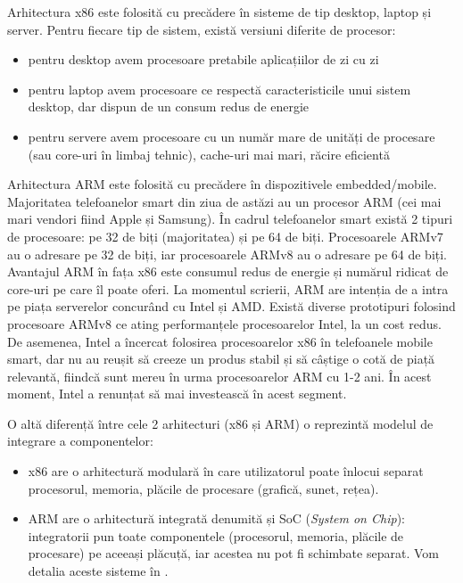 Arhitectura x86 este folosită cu precădere în sisteme de tip desktop, laptop și
server. Pentru fiecare tip de sistem, există versiuni diferite de procesor:

\begin{itemize}
  \item pentru desktop avem procesoare pretabile aplicațiilor de zi cu zi
  \item pentru laptop avem procesoare ce respectă caracteristicile unui
          sistem desktop, dar dispun de un consum redus de energie
  \item pentru servere avem procesoare cu un număr mare de unități de
          procesare (sau core-uri în limbaj tehnic), cache-uri mai mari,
          răcire eficientă
\end{itemize}

Arhitectura ARM este folosită cu precădere în dispozitivele embedded/mobile.
Majoritatea telefoanelor smart din ziua de astăzi au un procesor ARM (cei mai
mari vendori fiind Apple și Samsung). În cadrul telefoanelor smart există 2
tipuri de procesoare: pe 32 de biți (majoritatea) și pe 64 de biți. Procesoarele
ARMv7 au o adresare pe 32 de biți, iar procesoarele ARMv8 au o adresare pe 64 de
biți. Avantajul ARM în fața x86 este consumul redus de energie și numărul
ridicat de core-uri pe care îl poate oferi. La momentul scrierii, ARM are
intenția de a intra pe piața serverelor concurând cu Intel și AMD. Există
diverse prototipuri folosind procesoare ARMv8 ce ating performanțele
procesoarelor Intel, la un cost redus. De asemenea, Intel a încercat folosirea
procesoarelor x86 în telefoanele mobile smart, dar nu au reușit să creeze un
produs stabil și să câștige o cotă de piață relevantă, fiindcă sunt mereu în
urma procesoarelor ARM cu 1-2 ani. În acest moment, Intel a renunțat să mai
investească în acest segment.

O altă diferență între cele 2 arhitecturi (x86 și ARM) o reprezintă modelul de
integrare a componentelor:

\begin{itemize}
  \item x86 are o arhitectură modulară în care utilizatorul poate înlocui
          separat procesorul, memoria, plăcile de procesare (grafică,
          sunet, rețea).
  \item ARM are o arhitectură integrată denumită și SoC (\textit{System on Chip}):
          integratorii pun toate componentele (procesorul, memoria,
          plăcile de procesare) pe aceeași plăcuță, iar acestea nu pot fi
          schimbate separat. Vom detalia aceste sisteme în .
\end{itemize}

